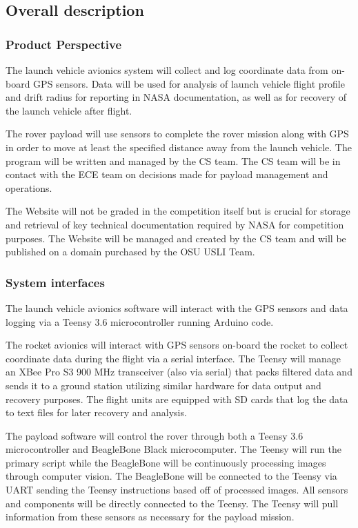 \documentclass[onecolumn, draftclsnofoot, 10pt, compsoc]{IEEEtran}
\begin{document}

\subsection{Overall description}
\subsubsection{Product Perspective}
The launch vehicle avionics system will collect and log coordinate data from on-board GPS sensors. Data will be used for analysis of launch vehicle flight profile and drift radius for reporting in NASA documentation, as well as for recovery of the launch vehicle after flight.

The rover payload will use sensors to complete the rover mission along with GPS in order to move at least the specified distance away from the launch vehicle. The program will be written and managed by the CS team. The CS team will be in contact with the ECE team on decisions made for payload management and operations. 

The Website will not be graded in the competition itself but is crucial for storage and retrieval of key technical documentation required by NASA for competition purposes. The Website will be managed and created by the CS team and will be published on a domain purchased by the OSU USLI Team. 

\subsubsection{System interfaces}
The launch vehicle avionics software will interact with the GPS sensors and data logging via a Teensy 3.6 microcontroller running Arduino code. 
\vspace{.5cm}

\noindent The rocket avionics will interact with GPS sensors on-board the rocket to collect coordinate data during the flight via a serial interface. The Teensy will manage an XBee Pro S3 900 MHz transceiver (also via serial) that packs filtered data and sends it to a ground station utilizing similar hardware for data output and recovery purposes. The flight units are equipped with SD cards that log the data to text files for later recovery and analysis.
\vspace{.5cm}

\noindent The payload software will control the rover through both a Teensy 3.6 microcontroller and BeagleBone Black microcomputer. The Teensy will run the primary script while the BeagleBone will be continuously processing images through computer vision. The BeagleBone will be connected to the Teensy via UART sending the Teensy instructions based off of processed images. All sensors and components will be directly connected to the Teensy. The Teensy will pull information from these sensors as necessary for the payload mission. 
\vspace{.5cm}
\end{document}

